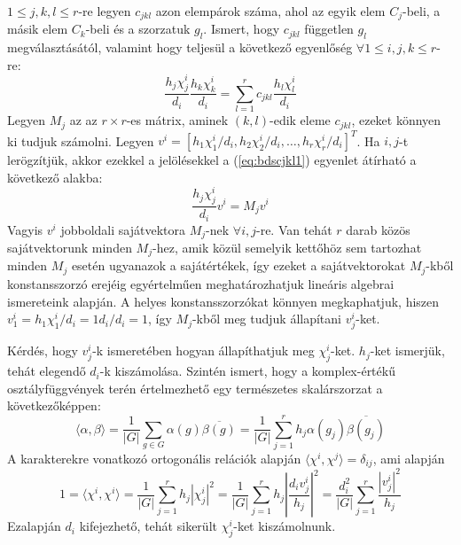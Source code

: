 $1 \le j, k, l \le r$-re legyen $c_{jkl}$ azon elempárok száma, ahol az egyik elem $C_j$-beli, a másik elem $C_k$-beli és a szorzatuk $g_l$.
Ismert, hogy $c_{jkl}$ független $g_l$ megválasztásától, valamint hogy teljesül a következő egyenlőség $\forall 1 \le i, j, k \le r$-re:
\begin{equation}
\label{eq:bdscjkl1}
\frac{h_j\chi^i_j}{d_i}\frac{h_k\chi^i_k}{d_i}=\sum_{l=1}^r c_{jkl}\frac{h_l\chi^i_l}{d_i}
\end{equation}
Legyen $M_j$ az az $r\times r$-es mátrix, aminek $(k,l)$-edik eleme $c_{jkl}$, ezeket könnyen ki tudjuk számolni.
Legyen $v^i=[h_1\chi^i_1/d_i, h_2\chi^i_2/d_i, \dots, h_r\chi^i_r/d_i]^T$.
Ha $i, j$-t lerögzítjük, akkor ezekkel a jelölésekkel a (\ref{eq:bdscjkl1}) egyenlet átírható a következő alakba:
\begin{equation}
\label{eq:bdscjkl2}
\frac{h_j\chi^i_j}{d_i}v^i=M_j v^i
\end{equation}
Vagyis $v^i$ jobboldali sajátvektora $M_j$-nek $\forall i, j$-re.
Van tehát $r$ darab közös sajátvektorunk minden $M_j$-hez, amik közül semelyik kettőhöz sem tartozhat minden $M_j$ esetén ugyanazok a sajátértékek,
így ezeket a sajátvektorokat $M_j$-kből konstansszorzó erejéig egyértelműen meghatározhatjuk lineáris algebrai ismereteink alapján.
A helyes konstansszorzókat könnyen megkaphatjuk, hiszen $v^i_1=h_1\chi^i_1/d_i=1 d_i/d_i=1$, így $M_j$-kből meg tudjuk állapítani $v^i_j$-ket.

Kérdés, hogy $v^i_j$-k ismeretében hogyan állapíthatjuk meg $\chi^i_j$-ket.
$h_j$-ket ismerjük, tehát elegendő $d_i$-k kiszámolása.
Szintén ismert, hogy a komplex-értékű osztályfüggvények terén értelmezhető egy természetes skalárszorzat a következőképpen:
\begin{equation}
\label{eq:bdsscalar}
\langle \alpha, \beta \rangle = \frac{1}{|G|}\sum_{g\in G}\alpha(g)\overline{\beta(g)} = \frac{1}{|G|}\sum_{j=1}^r h_j \alpha(g_j) \overline{\beta(g_j)}
\end{equation}
A karakterekre vonatkozó ortogonális relációk alapján $\langle \chi^i, \chi^j \rangle = \delta_{ij}$, ami alapján
\begin{equation}
\label{eq:bdsdi1}
1 = \langle \chi^i, \chi^i \rangle = \frac{1}{|G|}\sum_{j=1}^r h_j |\chi^i_j|^2 = \frac{1}{|G|}\sum_{j=1}^r h_j \left|\frac{d_i v^i_j}{h_j}\right|^2 = 
\frac{d_i^2}{|G|}\sum_{j=1}^r \frac{|v^i_j|^2}{h_j}
\end{equation}
Ezalapján $d_i$ kifejezhető, tehát sikerült $\chi^i_j$-ket kiszámolnunk.

